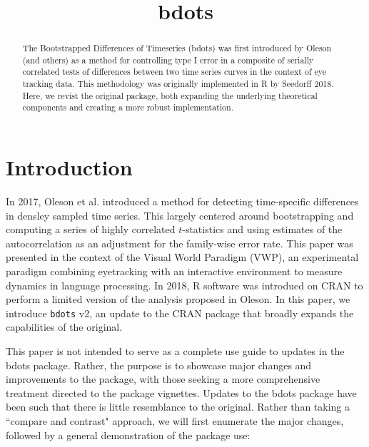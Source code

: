\documentclass{article}
\title{bdots}
\date{}
\begin{document}

\maketitle

%

\begin{abstract}
The Bootstrapped Differences of Timeseries (bdots) was first introduced by Oleson (and others) as a method for controlling type I error in a composite of serially correlated tests of differences between two time series curves in the context of eye tracking data.  This methodology was originally implemented in R by Seedorff 2018. Here, we revist the original package, both expanding the underlying theoretical components and creating a more robust implementation.
\end{abstract}

\section{Introduction}

In 2017, Oleson et al. introduced a method for detecting time-specific differences in densley sampled time series. This largely centered around bootstrapping and computing a series of highly correlated $t$-statistics and using estimates of the autocorrelation as an adjustment for the family-wise error rate. This paper was presented in the context of the Visual World Paradigm (VWP), an experimental paradigm combining eyetracking with an interactive environment to measure dynamics in language processing. In 2018, R software was introdued on CRAN to perform a limited version of the analysis proposed in Oleson. In this paper, we introduce \texttt{bdots} v2, an update to the CRAN package that broadly expands the capabilities of the original. 

This paper is not intended to serve as a complete use guide to updates in the bdots package. Rather, the purpose is to showcase major changes and improvements to the package, with those seeking a more comprehensive treatment directed to the package vignettes. Updates to the bdots package have been such that there is little resemblance to the original. Rather than taking a ``compare and contrast" approach, we will first enumerate the major changes, followed by a general demonstration of the package use:
\end{document}
